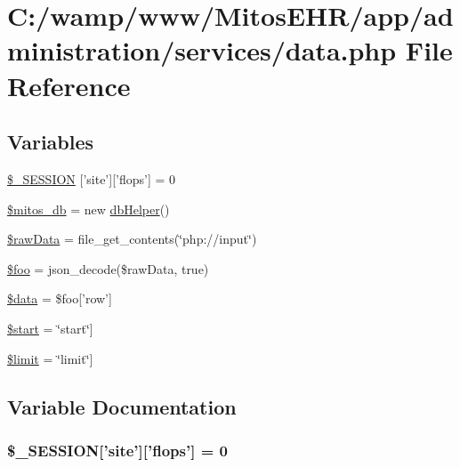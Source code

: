 \hypertarget{administration_2services_2data_8php}{\section{\-C\-:/wamp/www/\-Mitos\-E\-H\-R/app/administration/services/data.php \-File \-Reference}
\label{administration_2services_2data_8php}
}
\subsection*{\-Variables}
\begin{DoxyCompactItemize}
\item 
\hyperlink{administration_2services_2data_8php_a99fda8552a3e58235643b79f5af3ded8}{\$\-\_\-\-S\-E\-S\-S\-I\-O\-N} \mbox{[}'site'\mbox{]}\mbox{[}'flops'\mbox{]} = 0
\item 
\hyperlink{administration_2services_2data_8php_ab5d961f93efe4e2e8d8374f01dd6c65a}{\$mitos\-\_\-db} = new \hyperlink{classdb_helper}{db\-Helper}()
\item 
\hyperlink{administration_2services_2data_8php_ad66cfed6c1f454fbc3f3c6fdc8842a7b}{\$raw\-Data} = file\-\_\-get\-\_\-contents(\char`\"{}php\-://input\char`\"{})
\item 
\hyperlink{administration_2services_2data_8php_a7a1efa8a0f6183fb3a5e8e8b0696526c}{\$foo} = json\-\_\-decode(\$raw\-Data, true)
\item 
\hyperlink{administration_2services_2data_8php_a6efc15b5a2314dd4b5aaa556a375c6d6}{\$data} = \$foo\mbox{[}'row'\mbox{]}
\item 
\hyperlink{administration_2services_2data_8php_a50a00e7de77365e00b117e73aa82fb9b}{\$start} = \char`\"{}start\char`\"{}\mbox{]}
\item 
\hyperlink{administration_2services_2data_8php_ae05862a0294251c88629b141b5ce329a}{\$limit} = \char`\"{}limit\char`\"{}\mbox{]}
\end{DoxyCompactItemize}


\subsection{\-Variable \-Documentation}
\hypertarget{administration_2services_2data_8php_a99fda8552a3e58235643b79f5af3ded8}{
\subsubsection[{\$\-\_\-\-S\-E\-S\-S\-I\-O\-N}]{\setlength{\rightskip}{0pt plus 5cm}\$\-\_\-\-S\-E\-S\-S\-I\-O\-N\mbox{[}'site'\mbox{]}\mbox{[}'flops'\mbox{]} = 0}}\label{administration_2services_2data_8php_a99fda8552a3e58235643b79f5af3ded8}


